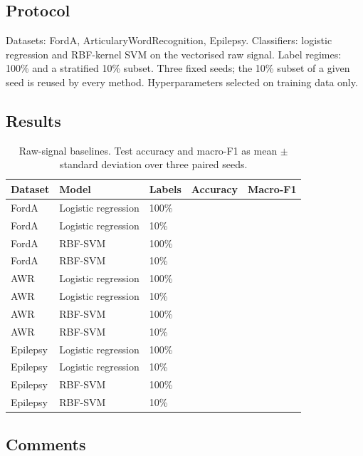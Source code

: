 \documentclass[a4paper,11pt]{article}
\newcommand{\TODOfill}{\todo[inline]{Fill in.}}
\begin{document}
\subsection{Protocol}
Datasets: FordA, ArticularyWordRecognition, Epilepsy. Classifiers: logistic regression and
RBF-kernel SVM on the vectorised raw signal. Label regimes: 100\% and a stratified 10\% subset.
Three fixed seeds; the 10\% subset of a given seed is reused by every method.
Hyperparameters selected on training data only.
\TODOfill

\subsection{Results}

\begin{table}[h]
    \centering
    \small
    \begin{tabular}{l l l c c}
        \toprule
        Dataset & Model & Labels & Accuracy & Macro-F1 \\
        \midrule
        FordA & Logistic regression & 100\% & & \\
        FordA & Logistic regression & 10\%  & & \\
        FordA & RBF-SVM             & 100\% & & \\
        FordA & RBF-SVM             & 10\%  & & \\
        \midrule
        AWR & Logistic regression & 100\% & & \\
        AWR & Logistic regression & 10\%  & & \\
        AWR & RBF-SVM             & 100\% & & \\
        AWR & RBF-SVM             & 10\%  & & \\
        \midrule
        Epilepsy & Logistic regression & 100\% & & \\
        Epilepsy & Logistic regression & 10\%  & & \\
        Epilepsy & RBF-SVM             & 100\% & & \\
        Epilepsy & RBF-SVM             & 10\%  & & \\
        \bottomrule
    \end{tabular}
    \caption{Raw-signal baselines. Test accuracy and macro-F1 as mean $\pm$ standard deviation over three paired seeds.}
    \label{tab:baselines}
\end{table}

\subsection{Comments}
\TODOfill
\end{document}
